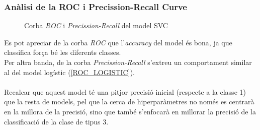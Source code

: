 \documentclass[a4paper, 11pt]{article}
\begin{document}
\subsubsection{Anàlisi de la ROC i Precission-Recall Curve} \label{ROC_SVC}
\begin{figure}[h]
\centering
    \caption{Corba \textit{ROC} i \textit{Precission-Recall} del model SVC}
    \label{fig:my_label}
\end{figure}
\hspace{-1.6em}Es pot apreciar de la corba \textit{ROC} que l'\textit{accuracy} del model és bona, ja que classifica força bé les diferents classes. \\
Per altra banda, de la corba \textit{Precission-Recall} s'extreu un comportament similar al del model logístic (\textcolor{blue}{\ref{ROC_LOGISTIC}}). \\
\\
Recalcar que aquest model té una pitjor precisió inicial (respecte a la classe 1) que la resta de models, pel que la cerca de hiperparàmetres no només es centrarà en la millora de la precisió, sino que també s'enfocarà en millorar la precisió de la classificació de la clase de tipus $3$.
\newpage
\end{document}
